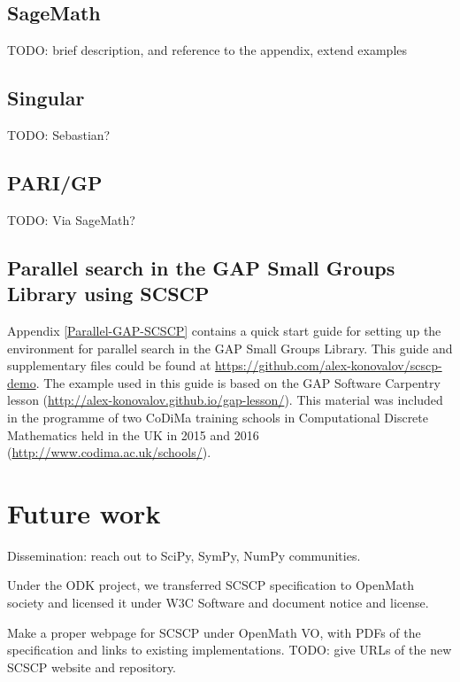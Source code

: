 \documentclass{deliverablereport}
\begin{document}
\subsection{SageMath}

TODO: brief description, and reference to the appendix, extend examples


\subsection{Singular}

TODO: Sebastian?


\subsection{PARI/GP}

TODO: Via SageMath?


\subsection{Parallel search in the GAP Small Groups Library using SCSCP}

Appendix \ref{Parallel-GAP-SCSCP} contains a quick start guide for setting
up the environment for parallel search in the GAP Small Groups Library. This
guide and supplementary files could be found at \url{https://github.com/alex-konovalov/scscp-demo}. The example used in this guide is based on the GAP Software Carpentry
lesson (\url{http://alex-konovalov.github.io/gap-lesson/}). This material was
included in the programme of two CoDiMa training schools in Computational
Discrete Mathematics held in the UK in 2015 and 2016
(\url{http://www.codima.ac.uk/schools/}).


\section{Future work}

Dissemination: reach out to SciPy, SymPy, NumPy communities.

Under the ODK project, we transferred SCSCP specification
to OpenMath society and licensed it under
W3C Software and document notice and license.

Make a proper webpage for SCSCP under OpenMath VO, with
PDFs of the specification and links to existing implementations.
TODO: give URLs of the new SCSCP website and repository.
\end{document}
